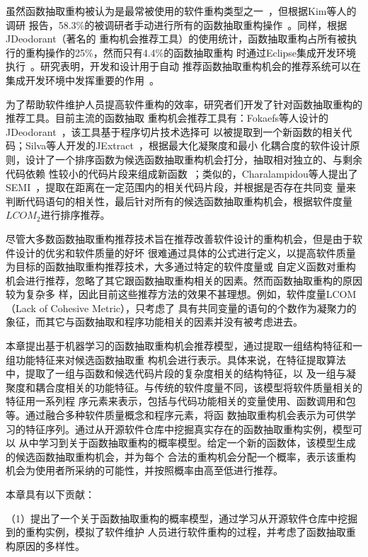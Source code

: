 虽然函数抽取重构被认为是最常被使用的软件重构类型之一~\cite{Murphy-Hill:ICSE09}，但根据Kim等人的调研
报告，58.3\%的被调研者手动进行所有的函数抽取重构操作~\cite{Kim:FSE12}。同样，根据JDeodorant（著名的
重构机会推荐工具）的使用统计，函数抽取重构占所有被执行的重构操作的25\%，然而只有4.4\%的函数抽取重构
时通过Eclipse集成开发环境执行~\cite{Negara:ECOOP13,Murphy-Hill:ICSE09}。研究表明，开发和设计用于自动
推荐函数抽取重构机会的推荐系统可以在集成开发环境中发挥重要的作用~\cite{Tsantalis:2011}。

为了帮助软件维护人员提高软件重构的效率，研究者们开发了针对函数抽取重构的推荐工具。目前主流的函数抽取
重构机会推荐工具有：Fokaefs等人设计的JDeodorant~\cite{fokaefs:icse11}，该工具基于程序切片技术选择可
以被提取到一个新函数的相关代码；Silva等人开发的JExtract~\cite{silva:CoRR15}，根据最大化凝聚度和最小
化耦合度的软件设计原则，设计了一个排序函数为候选函数抽取重构机会打分，抽取相对独立的、与剩余代码依赖
性较小的代码片段来组成新函数~\cite{silva:ICPC14}；类似的，Charalampidou等人提出了
SEMI~\cite{charalampidou2016identifying}，提取在距离在一定范围内的相关代码片段，并根据是否存在共同变
量来判断代码语句的相关性，最后针对所有的候选函数抽取重构机会，根据软件度量$LCOM_2$进行排序推荐。

尽管大多数函数抽取重构推荐技术旨在推荐改善软件设计的重构机会，但是由于软件设计的优劣和软件质量的好坏
很难通过具体的公式进行定义，以提高软件质量为目标的函数抽取重构推荐技术，大多通过特定的软件度量或
自定义函数对重构机会进行推荐，忽略了其它跟函数抽取重构相关的因素。然而函数抽取重构的原因较为复杂多
样，因此目前这些推荐方法的效果不甚理想。例如，软件度量LCOM（Lack of Cohesive Metric），只考虑了
具有共同变量的语句的个数作为凝聚力的象征，而其它与函数抽取和程序功能相关的因素并没有被考虑进去。

本章提出基于机器学习的函数抽取重构机会推荐模型，通过提取一组结构特征和一组功能特征来对候选函数抽取重
构机会进行表示。具体来说，在特征提取算法中，提取了一组与函数和候选代码片段的复杂度相关的结构特征，以
及一组与凝聚度和耦合度相关的功能特征。与传统的软件度量不同，该模型将软件质量相关的特征用一系列程
序元素来表示，包括与代码功能相关的变量使用、函数调用和包等。通过融合多种软件质量概念和程序元素，将函
数抽取重构机会表示为可供学习的特征序列。通过从开源软件仓库中挖掘真实存在的函数抽取重构实例，模型可以
从中学习到关于函数抽取重构的概率模型。给定一个新的函数体，该模型生成的候选函数抽取重构机会，并为每个
合法的重构机会分配一个概率，表示该重构机会为使用者所采纳的可能性，并按照概率由高至低进行推荐。

本章具有以下贡献：

（1）提出了一个关于函数抽取重构的概率模型，通过学习从开源软件仓库中挖掘到的重构实例，模拟了软件维护
人员进行软件重构的过程，并考虑了函数抽取重构原因的多样性。

